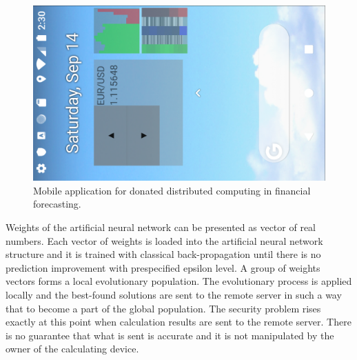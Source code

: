 \documentclass[graybox]{svmult}
\begin{document}
\begin{figure}[b]
\sidecaption
\includegraphics[width=\textwidth]{fig04}
\caption{Mobile application for donated distributed computing in financial forecasting.}
\label{fig:04}
\end{figure}

Weights of the artificial neural network can be presented as vector of real numbers. Each vector of weights is loaded into the artificial neural network structure and it is trained with classical back-propagation until there is no prediction improvement with prespecified epsilon level. A group of weights vectors forms a local evolutionary population. The evolutionary process is applied locally and the best-found solutions are sent to the remote server in such a way that to become a part of the global population. The security problem rises exactly at this point when calculation results are sent to the remote server. There is no guarantee that what is sent is accurate and it is not manipulated by the owner of the calculating device. 
\end{document}
